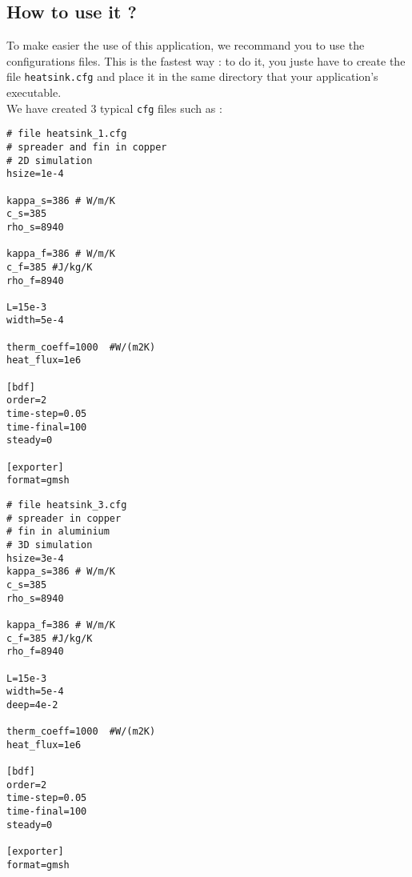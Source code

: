 \subsection{How to use it ?}
To make easier the use of this application, we recommand you to use the configurations files. This is the fastest way : to do it, you juste have to create the file \lstinline!heatsink.cfg! and place it in the same directory that your application's executable. \\
We have created $3$ typical \lstinline!cfg! files such as :
\begin{lstlisting}
# file heatsink_1.cfg
# spreader and fin in copper
# 2D simulation
hsize=1e-4

kappa_s=386 # W/m/K                                                                                                                                      
c_s=385
rho_s=8940

kappa_f=386 # W/m/K                                                                                                                                      
c_f=385 #J/kg/K                                                                                                                                          
rho_f=8940

L=15e-3
width=5e-4                                                                                                                                               

therm_coeff=1000  #W/(m2K)                                                                                                                               
heat_flux=1e6

[bdf]
order=2
time-step=0.05
time-final=100
steady=0

[exporter]
format=gmsh
\end{lstlisting}

\begin{lstlisting}
# file heatsink_3.cfg
# spreader in copper
# fin in aluminium
# 3D simulation
hsize=3e-4
kappa_s=386 # W/m/K                                                                                                                                      
c_s=385
rho_s=8940

kappa_f=386 # W/m/K                                                                                                                                      
c_f=385 #J/kg/K                                                                                                                                          
rho_f=8940

L=15e-3
width=5e-4
deep=4e-2

therm_coeff=1000  #W/(m2K)                                                                                                                               
heat_flux=1e6

[bdf]
order=2
time-step=0.05
time-final=100
steady=0

[exporter]
format=gmsh
\end{lstlisting}


